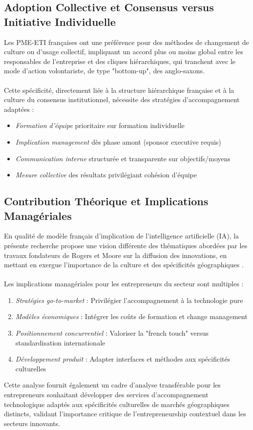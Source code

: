 \subsection{Adoption Collective et Consensus versus Initiative Individuelle}

Les PME-ETI françaises ont une préférence pour des méthodes de changement de culture ou d’usage collectif, impliquant un accord plus ou moins global entre les responsables de l’entreprise et des cliques hiérarchiques, qui tranchent avec le mode d’action volontariste, de type "bottom-up", des anglo-saxons.
\\\\
Cette spécificité, directement liée à la structure hiérarchique française et à la culture du consensus institutionnel, nécessite des stratégies d'accompagnement adaptées :
\begin{itemize}
    \item \emph{Formation d'équipe} prioritaire sur formation individuelle
    \item \emph{Implication management} dès phase amont (sponsor executive requis)  
    \item \emph{Communication interne} structurée et transparente sur objectifs/moyens
    \item \emph{Mesure collective} des résultats privilégiant cohésion d'équipe
\end{itemize}

\subsection{Contribution Théorique et Implications Managériales}

En qualité de modèle français d'implication de l'intelligence artificielle (IA), la présente recherche propose une vision différente des thématiques abordées par les travaux fondateurs de Rogers et Moore sur la diffusion des innovations, en mettant en exergue l'importance de la culture et des spécificités géographiques \cite{rogers2003diffusion,moore2014crossing}.
\\\\
Les implications managériales pour les entrepreneurs du secteur sont multiples :
\begin{enumerate}
    \item \emph{Stratégies go-to-market} : Privilégier l'accompagnement à la technologie pure
    \item \emph{Modèles économiques} : Intégrer les coûts de formation et change management  
    \item \emph{Positionnement concurrentiel} : Valoriser la "french touch" versus standardisation internationale
    \item \emph{Développement produit} : Adapter interfaces et méthodes aux spécificités culturelles
\end{enumerate}
\medskip
Cette analyse fournit également un cadre d'analyse transférable pour les entrepreneurs souhaitant développer des services d'accompagnement technologique adaptés aux spécificités culturelles de marchés géographiques distincts, validant l'importance critique de l'entrepreneurship contextuel dans les secteurs innovants.
